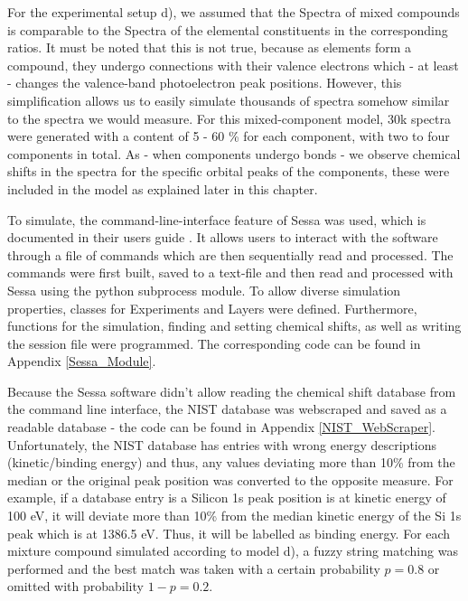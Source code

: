 For the experimental setup d), we assumed that the Spectra of mixed compounds is comparable to the Spectra of the elemental constituents in the corresponding ratios. It must be noted that this is not true, because as elements form a compound, they undergo connections with their valence electrons which - at least - changes the valence-band photoelectron peak positions. However, this simplification allows us to easily simulate thousands of spectra somehow similar to the spectra we would measure. For this mixed-component model, 30k spectra were generated with a content of 5 - 60 \% for each component, with two to four components in total. As - when components undergo bonds - we observe chemical shifts in the spectra for the specific orbital peaks of the components, these were included in the model as explained later in this chapter.
 
To simulate, the command-line-interface feature of Sessa was used, which is documented in their users guide \cite{werner_simulation_2021}. It allows users to interact with the software through a file of commands which are then sequentially read and processed. The commands were first built, saved to a text-file and then read and processed with Sessa using the python subprocess module. To allow diverse simulation properties, classes for Experiments and Layers were defined. Furthermore, functions for the simulation, finding and setting chemical shifts, as well as writing the session file were programmed. The corresponding code can be found in Appendix \ref{Sessa_Module}.

Because the Sessa software didn't allow reading the chemical shift database from the command line interface, the NIST database was webscraped and saved as a readable database - the code can be found in Appendix \ref{NIST_WebScraper}. Unfortunately, the NIST database has entries with wrong energy descriptions (kinetic/binding energy) and thus, any values deviating more than 10\% from the median or the original peak position was converted to the opposite measure. For example, if a database entry is a Silicon 1s peak position is at kinetic energy of 100 eV, it will deviate more than 10\% from the median kinetic energy of the Si 1s peak which is at 1386.5 eV. Thus, it will be labelled as binding energy. 
For each mixture compound simulated according to model d), a fuzzy string matching was performed and the best match was taken with a certain probability $p=0.8$ or omitted with probability $1-p = 0.2$.


